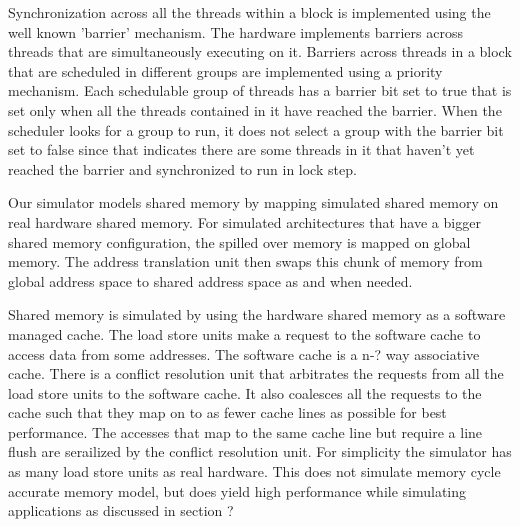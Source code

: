 \documentclass[conference, 10pt]{IEEEtran}
\begin{document}
Synchronization across all the threads within a block is implemented using the well known 'barrier' 
mechanism. The hardware implements barriers across threads that are simultaneously executing on it. 
Barriers across threads in a block that are scheduled in different groups are implemented using a 
priority mechanism. Each schedulable group of threads has a barrier bit set to true that is set only 
when all the threads contained in it have reached the barrier. When the scheduler looks for a group 
to run, it does not select a group with the barrier bit set to false since that indicates there are 
some threads in it that haven't yet reached the barrier and synchronized to run in lock step.
 

Our simulator models shared memory by mapping simulated shared memory on real hardware shared memory. 
For simulated architectures that have a bigger shared memory configuration, the spilled over memory is 
mapped on global memory. The address translation unit then swaps this chunk of memory from global 
address space to shared address space as and when needed. 

Shared memory is simulated by using the hardware shared memory as a software managed cache. The load 
store units make a request to the software cache to access data from some addresses. The software cache 
is a n-? way associative cache. There is a conflict resolution unit that arbitrates the requests from 
all the load store units to the software cache. It also coalesces all the requests to the cache such 
that they map on to as fewer cache lines as possible for best performance. The accesses that map to 
the same cache line but require a line flush are serailized by the conflict resolution unit. For simplicity 
the simulator has as many load store units as real hardware. This does not simulate memory cycle accurate 
memory model, but does yield high performance while simulating applications as discussed in section ? 

\end{document}
